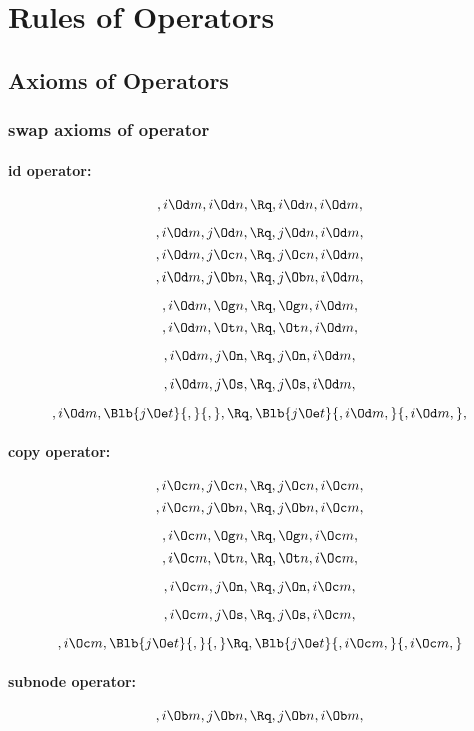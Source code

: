 
\chapter{Rules of Operators}
\section{Axioms of Operators}

\subsection{swap axioms of operator}
\subsubsection{id operator:}

\[,i \Od m, i \Od n, \Rq ,i \Od n, i \Od m,\]

\[,i \Od m, j \Od n, \Rq ,j \Od n, i \Od m,\]
\[,i \Od m, j \Oc n, \Rq ,j \Oc n, i \Od m,\]
\[,i \Od m, j \Ob n, \Rq ,j \Ob n, i \Od m,\]

\[,i \Od m,  \Og n, \Rq , \Og n, i \Od m,\]
\[,i \Od m,  \Ot n, \Rq , \Ot n, i \Od m,\]

\[,i \Od m, j \On, \Rq , j \On, i \Od m,\]

\[,i \Od m, j \Os, \Rq , j \Os, i \Od m,\]

\[,i \Od m, \Blb{j \Oe t}{,}{,}, \Rq , \Blb{j \Oe t}{,i \Od m,}{,i \Od m,},\]





\bigskip
\subsubsection{copy operator:}
\[,i \Oc m, j \Oc n, \Rq ,j \Oc n, i \Oc m,\]
\[,i \Oc m, j \Ob n, \Rq ,j \Ob n, i \Oc m,\]

\[,i \Oc m,  \Og n, \Rq , \Og n, i \Oc m,\]
\[,i \Oc m,  \Ot n, \Rq , \Ot n, i \Oc m,\]

\[,i \Oc m, j \On, \Rq , j \On, i \Oc m,\]

\[,i \Oc m, j \Os, \Rq , j \Os, i \Oc m,\]

\[,i \Oc m, \Blb{j \Oe t}{,}{,} \Rq , \Blb{j \Oe t}{,i \Oc m,}{,i \Oc m,}\]



\bigskip
\subsubsection{subnode operator:}
\[,i \Ob m, j \Ob n, \Rq ,j \Ob n, i \Ob m,\]

